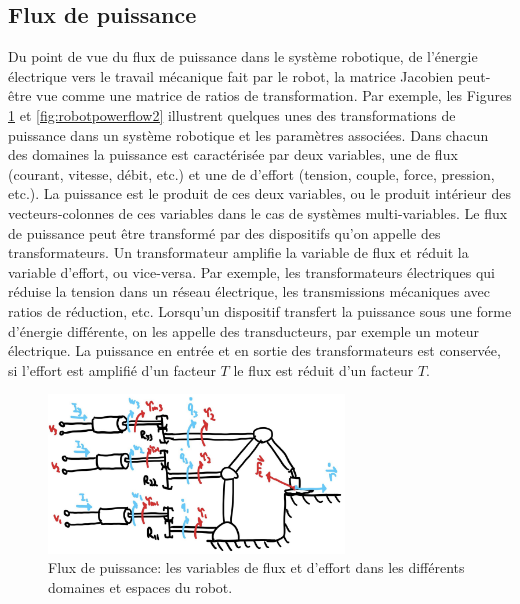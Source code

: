 \subsection{Flux de puissance}

Du point de vue du flux de puissance dans le système robotique, de l'énergie électrique vers le travail mécanique fait par le robot, la matrice Jacobien peut-être vue comme une matrice de ratios de transformation. Par exemple, les Figures \ref{fig:robotpowerflow1} et \ref{fig:robotpowerflow2} illustrent quelques unes des transformations de puissance dans un système robotique et les paramètres associées. Dans chacun des domaines la puissance est caractérisée par deux variables, une de flux (courant, vitesse, débit, etc.) et une de d'effort (tension, couple, force, pression, etc.). La puissance est le produit de ces deux variables, ou le produit intérieur des vecteurs-colonnes de ces variables dans le cas de systèmes multi-variables. Le flux de puissance peut être transformé par des dispositifs qu'on appelle des transformateurs. Un transformateur amplifie la variable de flux et réduit la variable d'effort, ou vice-versa. Par exemple, les transformateurs électriques qui réduise la tension dans un réseau électrique, les transmissions mécaniques avec ratios de réduction, etc. Lorsqu'un dispositif transfert la puissance sous une forme d'énergie différente, on les appelle des transducteurs, par exemple un moteur électrique. La puissance en entrée et en sortie des transformateurs est conservée, si l'effort est amplifié d'un facteur $T$ le flux est réduit d'un facteur $T$. 

\begin{figure}[htpb]
	\centering
		\includegraphics[width=0.70\textwidth]{fig/robotpowerflow1.jpg}
	\caption{Flux de puissance: les variables de flux et d'effort dans les différents domaines et espaces du robot.}
	\label{fig:robotpowerflow1}
\end{figure}


